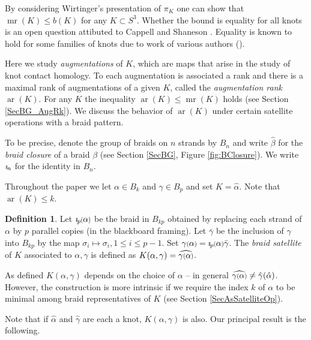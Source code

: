 \documentclass[11pt]{amsart}
\def\ltgreen{green!20!white}
\def\s{{\sigma}}
\def\ar{\operatorname{ar}}
\def\mr{\operatorname{mr}}
\newcommand*{\smallp}[1]{\scalebox{.75}{\ensuremath#1}}
\newcommand{\pp}[2][p]{\imath_{\hspace*{-1pt}#1}\hspace*{-.5pt}\smallp(#2\smallp)}
\theoremstyle{definition}
\newtheorem{defn}[thm]{Definition}
\begin{document}
By considering Wirtinger's presentation of $\pi_K$ one can show that $\mr(K)\le b(K)$ for any $K\subset S^3$. Whether the bound is equality for all knots is an open question attibuted to Cappell and Shaneson \cite[Prob. 1.11]{Kir95}. Equality is known to hold for some families of knots due to work of various authors (\cite{BZ,Cor13b,RZ}).

Here we study \emph{augmentations} of $K$, which are maps that arise in the study of knot contact homology. To each augmentation is associated a rank and there is a maximal rank of augmentations of a given $K$, called the \emph{augmentation rank} $\ar(K)$. For any $K$ the inequality $\ar(K)\le \mr(K)$ holds (see Section \ref{SecBG_AugRk}). We discuss the behavior of $\ar(K)$ under certain satellite operations with a braid pattern. 

To be precise, denote the group of braids on $n$ strands by $B_n$ and write $\hat{\beta}$ for the \emph{braid closure} of a braid $\beta$ (see Section \ref{SecBG}, Figure \ref{fig:BClosure}). We write $\imath_{\hspace*{-1pt}n}$ for the identity in $B_n$. 

Throughout the paper we let $\alpha\in B_k$ and $\gamma\in B_p$ and set $K = \hat{\alpha}$. Note that $\ar(K)\le k$.

\begin{defn} Let $\pp\alpha$ be the braid in $B_{kp}$ obtained by replacing each strand of $\alpha$ by $p$ parallel copies (in the blackboard framing). Let $\bar\gamma$ be the inclusion of $\gamma$ into $B_{kp}$ by the map $\s_i\mapsto\s_i, 1\le i\le p-1$. Set $\gamma\smallp(\alpha\smallp) = \pp\alpha\bar\gamma$. The \emph{braid satellite} of $K$ associated to $\alpha, \gamma$ is defined as $K(\alpha,\gamma) = \widehat{\gamma\smallp(\alpha\smallp)}$.
\label{defn:BraidSat}
\end{defn}
\todo[color=\ltgreen]{make a figure}

As defined $K(\alpha,\gamma)$ depends on the choice of $\alpha$ {--} in general $\widehat{\gamma\smallp(\alpha\smallp)} \ne \hat{\gamma}(\hat{\alpha})$. However, the construction is more intrinsic if we require the index $k$ of $\alpha$ to be minimal among braid representatives of $K$ (see Section \ref{SecAsSatelliteOp}). 

Note that if $\hat{\alpha}$ and $\hat{\gamma}$ are each a knot, $K(\alpha,\gamma)$ is also. Our principal result is the following.
\end{document}
